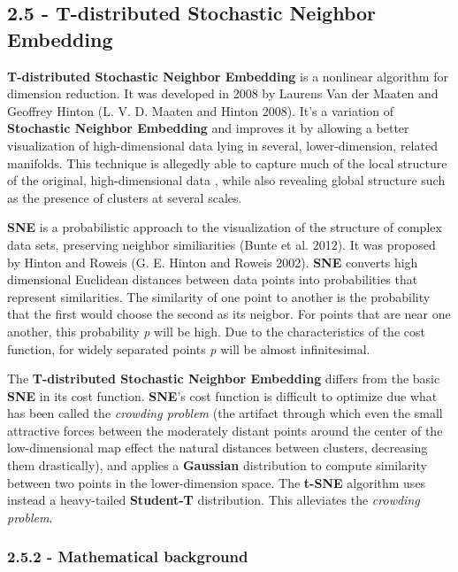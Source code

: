 \documentclass[]{article}
\begin{document}
\subsection{2.5 - T-distributed Stochastic Neighbor
Embedding}\label{t-distributed-stochastic-neighbor-embedding}

\textbf{T-distributed Stochastic Neighbor Embedding} is a nonlinear
algorithm for dimension reduction. It was developed in 2008 by Laurens
Van der Maaten and Geoffrey Hinton (L. V. D. Maaten and Hinton 2008).
It's a variation of \textbf{Stochastic Neighbor Embedding} and improves
it by allowing a better visualization of high-dimensional data lying in
several, lower-dimension, related manifolds. This technique is allegedly
able to capture much of the local structure of the original,
high-dimensional data , while also revealing global structure such as
the presence of clusters at several scales.

\textbf{SNE} is a probabilistic approach to the visualization of the
structure of complex data sets, preserving neighbor similiarities (Bunte
et al. 2012). It was proposed by Hinton and Roweis (G. E. Hinton and
Roweis 2002). \textbf{SNE} converts high dimensional Euclidean distances
between data points into probabilities that represent similarities. The
similarity of one point to another is the probability that the first
would choose the second as its neigbor. For points that are near one
another, this probability \emph{p} will be high. Due to the
characteristics of the cost function, for widely separated points
\emph{p} will be almost infinitesimal.

The \textbf{T-distributed Stochastic Neighbor Embedding} differs from
the basic \textbf{SNE} in its cost function. \textbf{SNE}'s cost
function is difficult to optimize due what has been called the
\emph{crowding problem} (the artifact through which even the small
attractive forces between the moderately distant points around the
center of the low-dimensional map effect the natural distances between
clusters, decreasing them drastically), and applies a \textbf{Gaussian}
distribution to compute similarity between two points in the
lower-dimension space. The \textbf{t-SNE} algorithm uses instead a
heavy-tailed \textbf{Student-T} distribution. This alleviates the
\emph{crowding problem}.

\subsubsection{2.5.2 - Mathematical
background}\label{mathematical-background-4}
\end{document}
